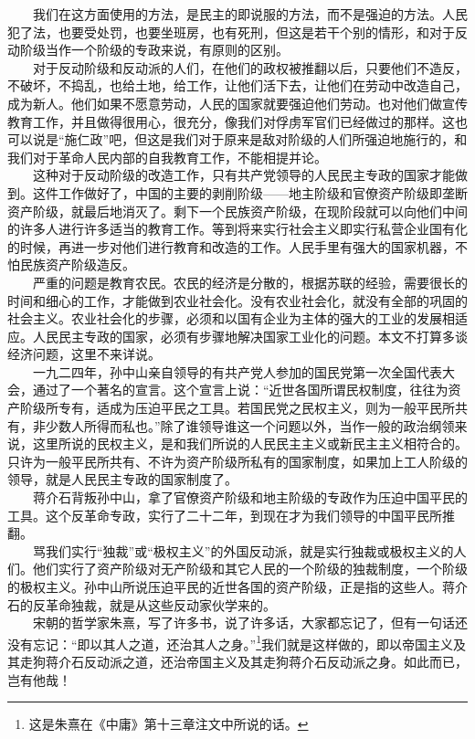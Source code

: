 \documentclass[cn,11pt,chinese]{elegantbook}
\begin{document}
　　我们在这方面使用的方法，是民主的即说服的方法，而不是强迫的方法。人民犯了法，也要受处罚，也要坐班房，也有死刑，但这是若干个别的情形，和对于反动阶级当作一个阶级的专政来说，有原则的区别。\\
　　对于反动阶级和反动派的人们，在他们的政权被推翻以后，只要他们不造反，不破坏，不捣乱，也给土地，给工作，让他们活下去，让他们在劳动中改造自己，成为新人。他们如果不愿意劳动，人民的国家就要强迫他们劳动。也对他们做宣传教育工作，并且做得很用心，很充分，像我们对俘虏军官们已经做过的那样。这也可以说是“施仁政”吧，但这是我们对于原来是敌对阶级的人们所强迫地施行的，和我们对于革命人民内部的自我教育工作，不能相提并论。\\
　　这种对于反动阶级的改造工作，只有共产党领导的人民民主专政的国家才能做到。这件工作做好了，中国的主要的剥削阶级——地主阶级和官僚资产阶级即垄断资产阶级，就最后地消灭了。剩下一个民族资产阶级，在现阶段就可以向他们中间的许多人进行许多适当的教育工作。等到将来实行社会主义即实行私营企业国有化的时候，再进一步对他们进行教育和改造的工作。人民手里有强大的国家机器，不怕民族资产阶级造反。\\
　　严重的问题是教育农民。农民的经济是分散的，根据苏联的经验，需要很长的时间和细心的工作，才能做到农业社会化。没有农业社会化，就没有全部的巩固的社会主义。农业社会化的步骤，必须和以国有企业为主体的强大的工业的发展相适应。人民民主专政的国家，必须有步骤地解决国家工业化的问题。本文不打算多谈经济问题，这里不来详说。\\
　　一九二四年，孙中山亲自领导的有共产党人参加的国民党第一次全国代表大会，通过了一个著名的宣言。这个宣言上说：“近世各国所谓民权制度，往往为资产阶级所专有，适成为压迫平民之工具。若国民党之民权主义，则为一般平民所共有，非少数人所得而私也。”除了谁领导谁这一个问题以外，当作一般的政治纲领来说，这里所说的民权主义，是和我们所说的人民民主主义或新民主主义相符合的。只许为一般平民所共有、不许为资产阶级所私有的国家制度，如果加上工人阶级的领导，就是人民民主专政的国家制度了。\\
　　蒋介石背叛孙中山，拿了官僚资产阶级和地主阶级的专政作为压迫中国平民的工具。这个反革命专政，实行了二十二年，到现在才为我们领导的中国平民所推翻。\\
　　骂我们实行“独裁”或“极权主义”的外国反动派，就是实行独裁或极权主义的人们。他们实行了资产阶级对无产阶级和其它人民的一个阶级的独裁制度，一个阶级的极权主义。孙中山所说压迫平民的近世各国的资产阶级，正是指的这些人。蒋介石的反革命独裁，就是从这些反动家伙学来的。\\
　　宋朝的哲学家朱熹，写了许多书，说了许多话，大家都忘记了，但有一句话还没有忘记：“即以其人之道，还治其人之身。”\footnote[11]{ 这是朱熹在《中庸》第十三章注文中所说的话。}我们就是这样做的，即以帝国主义及其走狗蒋介石反动派之道，还治帝国主义及其走狗蒋介石反动派之身。如此而已，岂有他哉！\\
\end{document}
